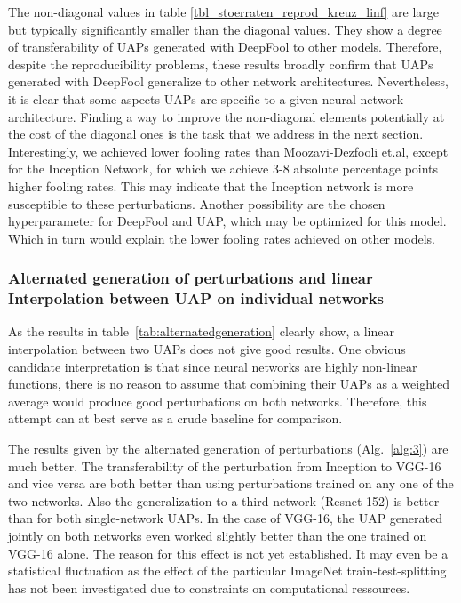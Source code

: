 \documentclass[runningheads]{llncs}
\begin{document}
The non-diagonal values in table \ref{tbl_stoerraten_reprod_kreuz_linf} are large but typically significantly smaller than the diagonal values. They show a degree of transferability of UAPs generated with DeepFool to other models. Therefore, despite the reproducibility problems, these results broadly confirm that UAPs generated with DeepFool generalize to other network architectures. Nevertheless, it is clear that some aspects UAPs are specific to a given neural network architecture. Finding a way to improve the non-diagonal elements potentially at the cost of the diagonal ones is the task that we address in the next section.
Interestingly, we achieved lower fooling rates than Moozavi-Dezfooli et.al, except for the Inception Network, for which we achieve 3-8 absolute percentage points higher fooling rates. This may indicate that the Inception network is more susceptible to these perturbations. Another possibility are the chosen hyperparameter for DeepFool and UAP, which may be optimized for this model. Which in turn would explain the lower fooling rates achieved on other models.

\subsubsection{Alternated generation of perturbations and linear Interpolation between UAP on individual networks}
As the results in table~\ref{tab:alternatedgeneration} clearly show, a linear interpolation between two UAPs does not give good results. One obvious candidate interpretation is that since neural networks are highly non-linear functions, there is no reason to assume that combining their UAPs as a weighted average would produce good perturbations on both networks. Therefore, this attempt can at best serve as a crude baseline for comparison. 

The results given by the alternated generation of perturbations (Alg.~\ref{alg:3}) are much better. The transferability of the perturbation from Inception to VGG-16 and vice versa are both better than using perturbations trained on any one of the two networks. Also the generalization to a third network (Resnet-152) is better than for both single-network UAPs. In the case of VGG-16, the UAP generated jointly on both networks even worked slightly better than the one trained on VGG-16 alone. The reason for this effect is not yet established. It may even be a statistical fluctuation as the effect of the particular ImageNet train-test-splitting has not been investigated due to constraints on computational ressources. 
\end{document}
